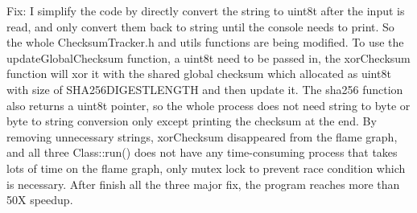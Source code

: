 \documentclass[12pt]{article}
\begin{document}
\indent Fix: I simplify the code by directly convert the string to uint8\textunderscore t after the input is read, and only convert them back to string until the console needs to print. So the whole ChecksumTracker.h and utils functions are being modified. To use the updateGlobalChecksum function, a uint8\textunderscore t need to be passed in, the xorChecksum function will xor it with the shared global checksum which allocated as uint8\textunderscore t with size of SHA256\textunderscore DIGEST\textunderscore LENGTH and then update it. The sha256 function also returns a uint8\textunderscore t pointer, so the whole process does not need string to byte or byte to string conversion only except printing the checksum at the end. By removing unnecessary strings, xorChecksum disappeared from the flame graph, and all three Class::run() does not have any time-consuming process that takes lots of time on the flame graph, only mutex lock to prevent race condition which is necessary.  
After finish all the three major fix, the program reaches more than 50X speedup.\\
\end{document}
